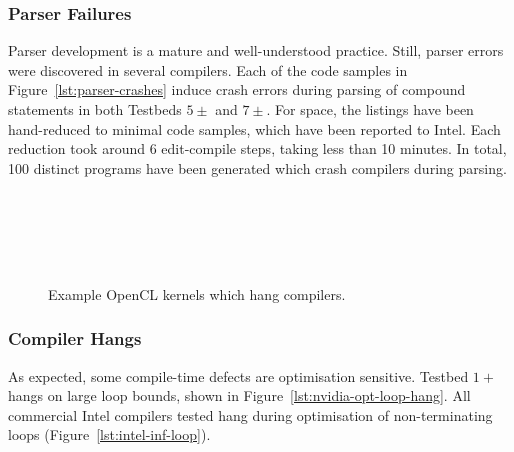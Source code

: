 \subsubsection{Parser Failures}

Parser development is a mature and well-understood practice. Still, parser errors were discovered in several compilers. Each of the code samples in Figure~\ref{lst:parser-crashes} induce crash errors during parsing of compound statements in both Testbeds $5\pm$ and $7\pm$. For space, the listings have been hand-reduced to minimal code samples, which have been reported to Intel. Each reduction took around 6 edit-compile steps, taking less than 10 minutes. In total, 100 distinct programs have been generated which crash compilers during parsing.


\begin{figure}
  \centering %
  \\%
  \\%
  \\%
  \\%
  \caption[Example kernels which hang compilers]{%
    Example OpenCL kernels which hang compilers.%
  }%
  \label{lst:compiler-hangs}
\end{figure}

\subsubsection{Compiler Hangs}

As expected, some compile-time defects are optimisation sensitive. Testbed $1+$ hangs on large loop bounds, shown in Figure~\ref{lst:nvidia-opt-loop-hang}. All commercial Intel compilers  tested hang during optimisation of non-terminating loops (Figure~\ref{lst:intel-inf-loop}).

